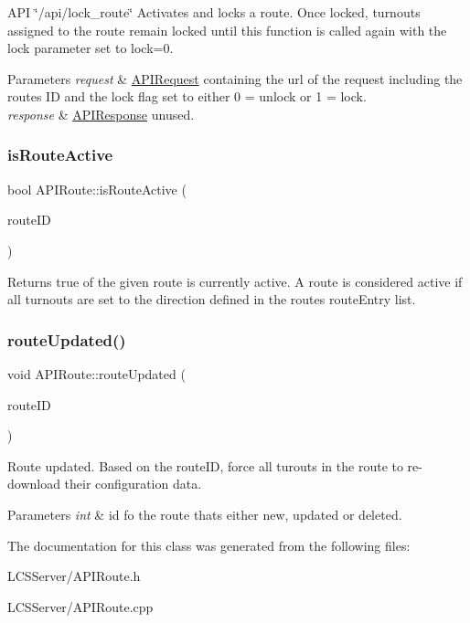A\+PI \char`\"{}/api/lock\+\_\+route\char`\"{} Activates and locks a route. Once locked, turnouts assigned to the route remain locked until this function is called again with the lock parameter set to lock=0. 
\begin{DoxyParams}{Parameters}
{\em request} & \hyperlink{class_a_p_i_request}{A\+P\+I\+Request} containing the url of the request including the route\textquotesingle{}s ID and the lock flag set to either 0 = unlock or 1 = lock. \\
\hline
{\em response} & \hyperlink{class_a_p_i_response}{A\+P\+I\+Response} unused. \\
\hline
\end{DoxyParams}
\mbox{\label{class_a_p_i_route_afbd5b3b86ddacee31d16330de4d069df}} 
\subsubsection{\texorpdfstring{is\+Route\+Active}{isRouteActive}}
{\footnotesize\ttfamily bool A\+P\+I\+Route\+::is\+Route\+Active (\begin{DoxyParamCaption}\item[{int}]{route\+ID }\end{DoxyParamCaption})\hspace{0.3cm}{\ttfamily [slot]}}

Returns true of the given route is currently active. A route is considered active if all turnouts are set to the direction defined in the route\textquotesingle{}s route\+Entry list. \mbox{\label{class_a_p_i_route_a69496cb286e280c033c115e45b43aea7}} 
\subsubsection{\texorpdfstring{route\+Updated()}{routeUpdated()}}
{\footnotesize\ttfamily void A\+P\+I\+Route\+::route\+Updated (\begin{DoxyParamCaption}\item[{int}]{route\+ID }\end{DoxyParamCaption})}

Route updated. Based on the route\+ID, force all turouts in the route to re-\/download their configuration data. 
\begin{DoxyParams}{Parameters}
{\em int} & id fo the route that\textquotesingle{}s either new, updated or deleted. \\
\hline
\end{DoxyParams}


The documentation for this class was generated from the following files\+:\begin{DoxyCompactItemize}
\item 
L\+C\+S\+Server/A\+P\+I\+Route.\+h\item 
L\+C\+S\+Server/A\+P\+I\+Route.\+cpp\end{DoxyCompactItemize}
